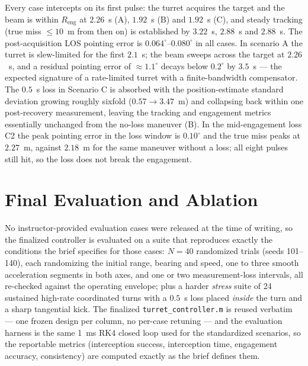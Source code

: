\documentclass[conference]{IEEEtran}
\begin{document}
Every case intercepts on its first pulse: the turret acquires the target and the beam is within $R_{\mathrm{eng}}$ at $2.26$~s (A), $1.92$~s (B) and $1.92$~s (C), and steady tracking (true miss $\le10$~m from then on) is established by $3.22$~s, $2.88$~s and $2.88$~s. The post-acquisition LOS pointing error is $0.064^\circ$--$0.080^\circ$ in all cases. In scenario A the turret is slew-limited for the first $2.1$~s; the beam sweeps across the target at $2.26$~s, and a residual pointing error of $\approx1.1^\circ$ decays below $0.2^\circ$ by $3.5$~s --- the expected signature of a rate-limited turret with a finite-bandwidth compensator. The $0.5$~s loss in Scenario C is absorbed with the position-estimate standard deviation growing roughly sixfold ($0.57\to3.47$~m) and collapsing back within one post-recovery measurement, leaving the tracking and engagement metrics essentially unchanged from the no-loss maneuver (B). In the mid-engagement loss C2 the peak pointing error in the loss window is $0.10^\circ$ and the true miss peaks at $2.27$~m, against $2.18$~m for the same maneuver without a loss; all eight pulses still hit, so the loss does not break the engagement.

\section{Final Evaluation and Ablation}\label{sec:final}
No instructor-provided evaluation cases were released at the time of writing, so the finalized controller is evaluated on a suite that reproduces exactly the conditions the brief specifies for those cases: $N=40$ randomized trials (seeds 101--140), each randomizing the initial range, bearing and speed, one to three smooth acceleration segments in both axes, and one or two measurement-loss intervals, all re-checked against the operating envelope; plus a harder \emph{stress} suite of 24 sustained high-rate coordinated turns with a $0.5$~s loss placed \emph{inside} the turn and a sharp tangential kick. The finalized \texttt{turret\_controller.m} is reused verbatim --- one frozen design per column, no per-case retuning --- and the evaluation harness is the same 1~ms RK4 closed loop used for the standardized scenarios, so the reportable metrics (interception success, interception time, engagement accuracy, consistency) are computed exactly as the brief defines them.
\end{document}
